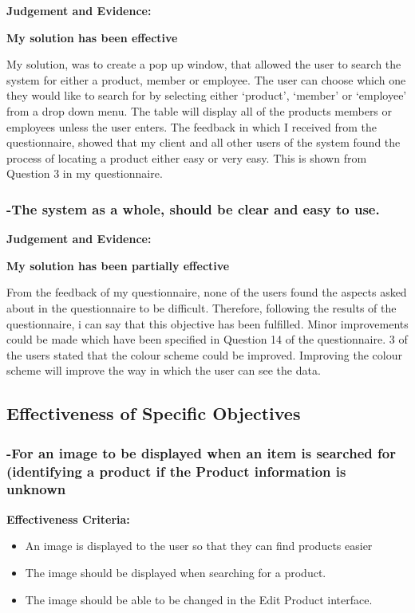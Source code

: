 \textbf{Judgement and Evidence:} \newline

\textbf{\large{My solution has been effective}}

My solution, was to create a pop up window, that allowed the user to search the system for either a product, member or employee. The user can choose which one they would like to search for by selecting either `product', `member' or `employee' from a drop down menu. The table will display all of the products members or employees unless the user enters. The feedback in which I received from the questionnaire, showed that my client and all other users of the system found the process of locating a product either easy or very easy. This is shown from Question 3 in my questionnaire.


\subsubsection{-The system as a whole, should be clear and easy to use.}

\textbf{Judgement and Evidence:} \newline

\textbf{\large{My solution has been partially effective}}

From the feedback of my questionnaire, none of the users found the aspects asked about in the questionnaire to be difficult. Therefore, following the results of the questionnaire, i can say that this objective has been fulfilled. Minor improvements could be made which have been specified in Question 14 of the questionnaire. 3 of the users stated that the colour scheme could be improved. Improving the colour scheme will improve the way in which the user can see the data. 



\pagebreak
\subsection{Effectiveness of Specific Objectives}



\subsubsection{-For an image to be displayed when an item is searched for (identifying a product if the Product information is unknown}

\textbf{Effectiveness Criteria:}\newline
\begin{itemize}
	\item{An image is displayed to the user so that they can find products easier}
	\item{The image should be displayed when searching for a product.}
	\item{The image should be able to be changed in the Edit Product interface.}
\end{itemize}

